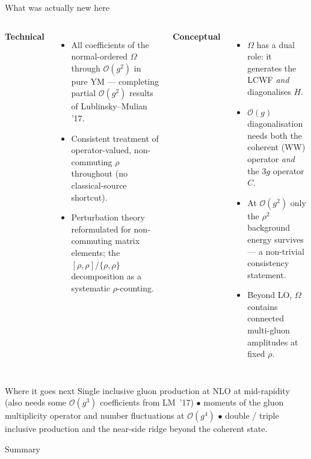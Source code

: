 \documentclass[9pt,aspectratio=169]{beamer}
\newcommand{\hl}[1]{\textcolor{acc}{#1}}
\newcommand{\hb}[1]{\textcolor{blu}{#1}}
\newcommand{\Om}{\Omega}
\begin{document}
\begin{frame}{What was actually new here}
\begin{columns}[T,onlytextwidth]
\textbf{Technical}
\begin{itemize}
  \item All coefficients of the normal-ordered $\Om$ through $\mathcal{O}(g^{2})$
        in pure YM --- completing partial $\mathcal{O}(g^{2})$ results of Lublinsky--Mulian '17.
  \item Consistent treatment of \hl{operator-valued, non-commuting} $\rho$
        throughout (no classical-source shortcut).
  \item Perturbation theory reformulated for \hl{non-commuting matrix elements};
        the $[\rho,\rho]/\{\rho,\rho\}$ decomposition as a systematic $\rho$-counting.
\end{itemize}
\textbf{Conceptual}
\begin{itemize}
  \item $\Om$ has a \hl{dual role}: it generates the LCWF \emph{and} diagonalises $H$.
  \item $\mathcal{O}(g)$ diagonalisation needs \hb{both} the coherent (WW) operator
        \emph{and} the $3g$ operator $C$.
  \item At $\mathcal{O}(g^{2})$ only the $\rho^{2}$ background energy survives ---
        a non-trivial consistency statement.
  \item Beyond LO, $\Om$ contains \hl{connected} multi-gluon amplitudes at fixed $\rho$.
\end{itemize}
\end{columns}
\vspace{-4pt}
\begin{block}{Where it goes next}
\vspace{-2pt}
{\small \hl{Single inclusive gluon production at NLO} at mid-rapidity (also needs some
$\mathcal{O}(g^{3})$ coefficients from LM~'17) \;$\bullet$\; moments of the gluon
\hb{multiplicity operator} and number \hb{fluctuations} at $\mathcal{O}(g^{4})$
\;$\bullet$\; double / triple inclusive production and the near-side ridge beyond the
coherent state.}
\end{block}
\end{frame}

\begin{frame}[standout]
Summary
\end{frame}
\end{document}
